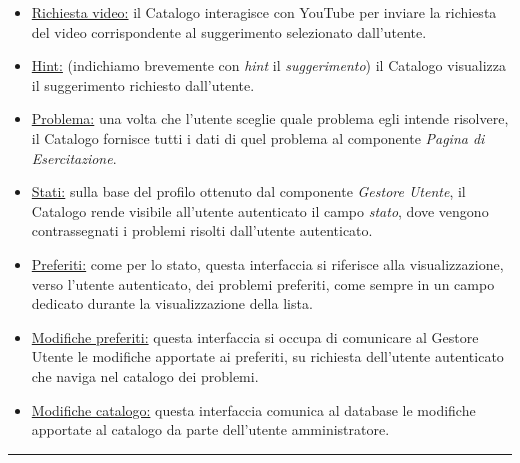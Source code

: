 \documentclass[11pt, a4paper]{article}
\theoremstyle{definition} %
\begin{document}
\begin{description}
\begin{itemize}
        \item \underline{Richiesta video:} il Catalogo interagisce con
        YouTube per inviare la richiesta del video corrispondente al
        suggerimento selezionato dall'utente.

        \item \underline{Hint:} (indichiamo brevemente con \textit{hint}
        il \textit{suggerimento}) il Catalogo visualizza il suggerimento
        richiesto dall'utente.

        \item \underline{Problema:} una volta che l'utente sceglie quale
        problema egli intende risolvere, il Catalogo fornisce tutti i
        dati di quel problema al componente \textit{Pagina di Esercitazione}.

        \item \underline{Stati:} sulla base del profilo ottenuto
        dal componente \textit{Gestore Utente}, il Catalogo rende
        visibile all'utente autenticato il campo \textit{stato},
        dove vengono contrassegnati i problemi risolti dall'utente
        autenticato.

        \item \underline{Preferiti:} come per lo stato, questa
        interfaccia si riferisce alla visualizzazione, verso l'utente
        autenticato, dei problemi preferiti, come sempre in un
        campo dedicato durante la visualizzazione della lista.

        \item \underline{Modifiche preferiti:} questa interfaccia
        si occupa di comunicare al Gestore Utente le modifiche
        apportate ai preferiti, su richiesta dell'utente autenticato
        che naviga nel catalogo dei problemi.

        \item \underline{Modifiche catalogo:} questa interfaccia
        comunica al database le modifiche apportate al catalogo
        da parte dell'utente amministratore.
    \end{itemize}
\end{description}

\begin{center}
    \rule{5cm}{1pt}
\end{center}
\end{document}

